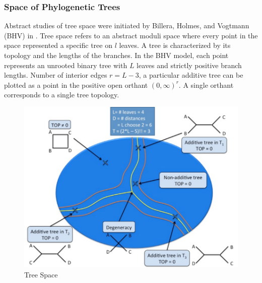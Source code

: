\subsubsection{Space of Phylogenetic Trees}

Abstract studies of tree space were initiated by Billera, Holmes, and Vogtmann (BHV) in \cite{Billera:2001tv}.
Tree space refers to an abstract moduli space where every point in the space represented a specific tree on $l$ leaves.
A tree is characterized by its topology and the lengths of the branches.
In the BHV model, each point represents an unrooted binary tree with $L$ leaves and strictly positive branch lengths.
Number of interior edges $r=L-3$, a particular additive tree can be plotted as a point in the positive open orthant $(0,\infty)^{r}$.
A single orthant corresponds to a single tree topology.

\begin{figure}
\centering
\includegraphics[]{./fig/TreeSpace.pdf}
\caption{Tree Space}
\label{background:fig:TreeSpace}
\end{figure}

